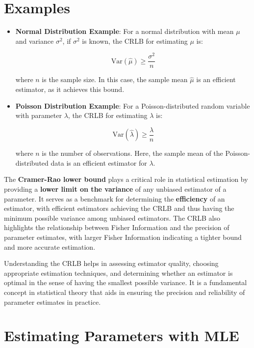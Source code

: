 \documentclass[
  12 pt,
  a4paper,
]{book}
\numberwithin{equation}{section}
\theoremstyle{plain}      %
\theoremstyle{definition} %
\theoremstyle{remark}     %
\theoremstyle{note}         %
\begin{document}
\hypertarget{examples}{%
\section{Examples}\label{examples}}

\begin{itemize}
\item
  \textbf{Normal Distribution Example}: For a normal distribution with
  mean \(\mu\) and variance \(\sigma^2\), if \(\sigma^2\) is known, the
  CRLB for estimating \(\mu\) is:

  \[
  \text{Var}(\hat{\mu}) \geq \frac{\sigma^2}{n}
  \]

  where \(n\) is the sample size. In this case, the sample mean
  \(\hat{\mu}\) is an efficient estimator, as it achieves this bound.
\item
  \textbf{Poisson Distribution Example}: For a Poisson-distributed
  random variable with parameter \(\lambda\), the CRLB for estimating
  \(\lambda\) is:

  \[
  \text{Var}(\hat{\lambda}) \geq \frac{\lambda}{n}
  \]

  where \(n\) is the number of observations. Here, the sample mean of
  the Poisson-distributed data is an efficient estimator for
  \(\lambda\).
\end{itemize}

The \textbf{Cramer-Rao lower bound} plays a critical role in statistical
estimation by providing a \textbf{lower limit on the variance} of any
unbiased estimator of a parameter. It serves as a benchmark for
determining the \textbf{efficiency} of an estimator, with efficient
estimators achieving the CRLB and thus having the minimum possible
variance among unbiased estimators. The CRLB also highlights the
relationship between Fisher Information and the precision of parameter
estimates, with larger Fisher Information indicating a tighter bound and
more accurate estimation.

Understanding the CRLB helps in assessing estimator quality, choosing
appropriate estimation techniques, and determining whether an estimator
is optimal in the sense of having the smallest possible variance. It is
a fundamental concept in statistical theory that aids in ensuring the
precision and reliability of parameter estimates in practice.

\newpage

\hypertarget{estimating-parameters-with-mle}{%
\section{Estimating Parameters with
MLE}\label{estimating-parameters-with-mle}}
\end{document}
